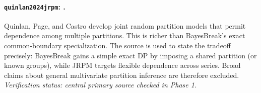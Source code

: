 
\paragraph{\texttt{quinlan2024jrpm}: \citet{quinlan2024jrpm}.}
Quinlan, Page, and Castro develop joint random partition models that permit dependence among multiple partitions. This is richer than BayesBreak's exact common-boundary specialization. The source is used to state the tradeoff precisely: BayesBreak gains a simple exact DP by imposing a shared partition (or known groups), while JRPM targets flexible dependence across series. Broad claims about general multivariate partition inference are therefore excluded. \textit{Verification status: central primary source checked in Phase 1.}
